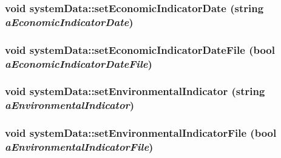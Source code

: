 \label{classsystem_data_a3ad4064f55517bdd76aa3d9fd11338a1}
\hypertarget{classsystem_data_a201b496b05aa8478a9f5114da56177fe}{
\subsubsection[{setEconomicIndicatorDate}]{\setlength{\rightskip}{0pt plus 5cm}void systemData::setEconomicIndicatorDate (string {\em aEconomicIndicatorDate})}}
\label{classsystem_data_a201b496b05aa8478a9f5114da56177fe}
\hypertarget{classsystem_data_a5a95933171ee2b4e62f2f28204f640a1}{
\subsubsection[{setEconomicIndicatorDateFile}]{\setlength{\rightskip}{0pt plus 5cm}void systemData::setEconomicIndicatorDateFile (bool {\em aEconomicIndicatorDateFile})}}
\label{classsystem_data_a5a95933171ee2b4e62f2f28204f640a1}
\hypertarget{classsystem_data_a9729b222f78ce6ba72382725e74c9fe1}{
\subsubsection[{setEnvironmentalIndicator}]{\setlength{\rightskip}{0pt plus 5cm}void systemData::setEnvironmentalIndicator (string {\em aEnvironmentalIndicator})}}
\label{classsystem_data_a9729b222f78ce6ba72382725e74c9fe1}
\hypertarget{classsystem_data_ad1a2ccae8bebbee4f696b67425d52ef6}{
\subsubsection[{setEnvironmentalIndicatorFile}]{\setlength{\rightskip}{0pt plus 5cm}void systemData::setEnvironmentalIndicatorFile (bool {\em aEnvironmentalIndicatorFile})}}
